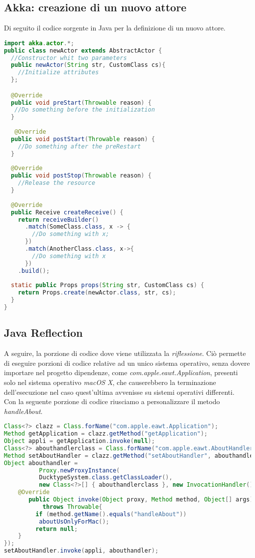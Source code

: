\subsection{Akka: creazione di un nuovo attore}
\label{sec:akkanew}
Di seguito il codice sorgente in Java per la definizione di un nuovo attore.
\begin{lstlisting}[language=java]
import akka.actor.*;
public class newActor extends AbstractActor {
  //Constructor whit two parameters
  public newActor(String str, CustomClass cs){
    //Initialize attributes
  };

  @Override
  public void preStart(Throwable reason) {
   //Do something before the initialization
  }
  
   @Override
  public void postStart(Throwable reason) {
    //Do something after the preRestart
  }
  
  @Override
  public void postStop(Throwable reason) {
    //Release the resource
  }
  
  @Override
  public Receive createReceive() {
    return receiveBuilder()
      .match(SomeClass.class, x -> {
        //Do something with x;
      })
      .match(AnotherClass.class, x->{
        //Do something with x
      })
    .build();
  
  static public Props props(String str, CustomClass cs) {
    return Props.create(newActor.class, str, cs);
  }
}
\end{lstlisting}
\subsection{Java Reflection}
\label{sec:javaReflection}
A seguire, la porzione di codice dove viene utilizzata la \emph{riflessione}. Ciò permette di eseguire
porzioni di codice relative ad un unico sistema operativo, senza dovere importare nel progetto
dipendenze, come \emph{com.apple.eawt.Application}, presenti solo nel sistema operativo \emph{macOS X}, che
causerebbero la terminazione dell'esecuzione nel caso quest'ultima avvenisse su sistemi operativi differenti.\\

Con la seguente porzione di codice riusciamo a personalizzare il metodo \emph{handleAbout}.
\begin{lstlisting}[language=java]
Class<?> clazz = Class.forName("com.apple.eawt.Application");
Method getApplication = clazz.getMethod("getApplication");
Object appli = getApplication.invoke(null);
Class<?> abouthandlerclass = Class.forName("com.apple.eawt.AboutHandler");
Method setAboutHandler = clazz.getMethod("setAboutHandler", abouthandlerclass);
Object abouthandler = 
          Proxy.newProxyInstance(
          DucktypeSystem.class.getClassLoader(),
          new Class<?>[] { abouthandlerclass }, new InvocationHandler(){
    @Override
       public Object invoke(Object proxy, Method method, Object[] args)
           throws Throwable{
         if (method.getName().equals("handleAbout"))
          aboutUsOnlyForMac();
         return null;
    }
});
setAboutHandler.invoke(appli, abouthandler);
\end{lstlisting}


